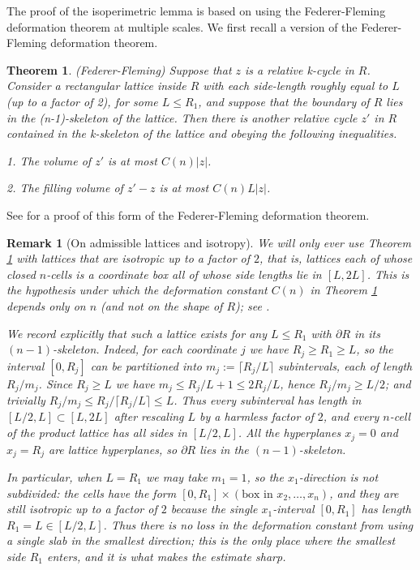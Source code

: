 \documentclass{amsart}
\newtheorem{theorem}{Theorem}
\newtheorem*{theorem 1}{Theorem 1}
\newtheorem*{theorem 2}{Theorem 2}
\newtheorem*{theorem 3}{Theorem 3}
\newtheorem{remark}{Remark}
\numberwithin{equation}{section}
\begin{document}
The proof of the isoperimetric lemma is based on using the Federer-Fleming deformation theorem at multiple scales.  We first recall a version of the Federer-Fleming deformation theorem.  


\begin{theorem} \label{FF} (Federer-Fleming) Suppose that $z$ is a relative k-cycle in $R$.
Consider a rectangular lattice inside $R$ with each side-length
roughly equal to $L$ (up to a factor of 2), for some $L \le R_1$,
and suppose that the boundary of $R$ lies in the (n-1)-skeleton
of the lattice.  Then there is another relative cycle $z'$ in $R$
contained in the k-skeleton of the lattice and obeying the 
following inequalities.

1. The volume of $z'$ is at most $C(n) |z|$.

2. The filling volume of $z' - z$ is at most $C(n) L |z|$.

\end{theorem}

See \cite{G3} for a proof of this form of the Federer-Fleming deformation theorem.  

\begin{remark}[On admissible lattices and isotropy] \label{rem:lattice}
We will only ever use Theorem \ref{FF} with lattices that are
\emph{isotropic up to a factor of $2$}, that is, lattices each of
whose closed $n$-cells is a coordinate box all of whose side
lengths lie in $[L,2L]$.  This is the hypothesis under which the
deformation constant $C(n)$ in Theorem \ref{FF} depends only on
$n$ (and not on the shape of $R$); see \cite{G3}.

We record explicitly that such a lattice exists for any
$L \le R_1$ with $\partial R$ in its $(n-1)$-skeleton.  Indeed, for
each coordinate $j$ we have $R_j \ge R_1 \ge L$, so the interval
$[0,R_j]$ can be partitioned into $m_j := \lceil R_j / L\rceil$
subintervals, each of length $R_j/m_j$.  Since $R_j \ge L$ we have
$m_j \le R_j/L + 1 \le 2 R_j / L$, hence
$R_j/m_j \ge L/2$; and trivially $R_j/m_j \le R_j/\lceil R_j/L
\rceil \le L$.  Thus every subinterval has length in $[L/2,L]
\subset [L,2L]$ after rescaling $L$ by a harmless factor of $2$,
and every $n$-cell of the product lattice has all sides in
$[L/2,L]$.  All the hyperplanes $x_j = 0$ and $x_j = R_j$ are
lattice hyperplanes, so $\partial R$ lies in the
$(n-1)$-skeleton.

In particular, when $L = R_1$ we may take $m_1 = 1$, so the
$x_1$-direction is \emph{not} subdivided: the cells have the form
$[0,R_1] \times (\text{box in } x_2,\dots,x_n)$, and they are
still isotropic up to a factor of $2$ because the single
$x_1$-interval $[0,R_1]$ has length $R_1 = L \in [L/2,L]$.  Thus
there is no loss in the deformation constant from using a single
slab in the smallest direction; this is the only place where the
\emph{smallest} side $R_1$ enters, and it is what makes the
estimate sharp.
\end{remark}
\end{document}
